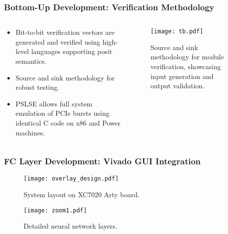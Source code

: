 \begin{frame}
    \frametitle{Bottom-Up Development: Verification Methodology}

    \begin{columns}
        \begin{column}{0.5\textwidth}
            \begin{itemize}
                \item<1-> Bit-to-bit verification vectors are generated and verified using high-level languages supporting posit semantics.
                \item<2-> Source and sink methodology for robust testing.
                \item<3-> PSLSE allows full system emulation of PCIe bursts using identical C code on x86 and Power machines.
            \end{itemize}
        \end{column}

        \begin{column}{0.5\textwidth}
            \begin{figure}
                \centering
                \texttt{[image: tb.pdf]}
                \caption{Source and sink methodology for module verification, showcasing input generation and output validation.}
                \label{fig:bit_to_bit}
            \end{figure}
        \end{column}
    \end{columns}

\end{frame}

\begin{frame}
    \frametitle{FC Layer Development: Vivado GUI Integration}

    \begin{figure}
        \centering
        \texttt{[image: overlay\_design.pdf]}
        \vspace{-0.5cm} %
        \caption{System layout on XC7020 Arty board.}
        \label{fig:overlay_design}

        \vspace{-0.3cm} %

        \texttt{[image: zoom1.pdf]}
        \vspace{-0.3cm} %
        \caption{Detailed neural network layers.}
        \label{fig:zoom_layers}
    \end{figure}

\end{frame}

